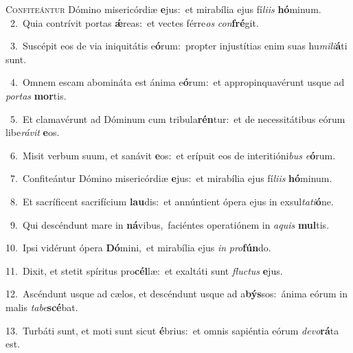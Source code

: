 \lettrine{\initial\textcolor{\initialcolor}{C}}{onfiteántur} Dómino misericórdiæ \textbf{e}\-jus:~\star et mirabília ejus fí\-\textit{li}\-\textit{is} \textbf{hó}\-minum.\\
{\numbfont\textcolor{\numbcolor}{~2.}}~Quia contrívit portas \textbf{ǽ}\-reas:~\star et vectes férre\textit{os} \textit{con}\-\textbf{fré}git.\par
{\numbfont\textcolor{\numbcolor}{~3.}}~Suscépit eos de via iniquitátis e\-\textbf{ó}\-rum:~\star propter injustítias enim suas hu\-\textit{mi}\-\textit{li}\textbf{á}ti sunt.\par
{\numbfont\textcolor{\numbcolor}{~4.}}~Omnem escam abomináta est ánima e\-\textbf{ó}\-rum:~\star et appropinquavérunt usque ad \textit{por}\-\textit{tas} \textbf{mor}\-tis.\par
{\numbfont\textcolor{\numbcolor}{~5.}}~Et clamavérunt ad Dóminum cum tribula\-\textbf{rén}\-tur:~\star et de necessitátibus eórum libe\-\textit{rá}\-\textit{vit} \textbf{e}\-os.\par
{\numbfont\textcolor{\numbcolor}{~6.}}~Misit verbum suum, et sanávit \textbf{e}\-os:~\star et erípuit eos de interitióni\textit{bus} \textit{e}\-\textbf{ó}rum.\par
{\numbfont\textcolor{\numbcolor}{~7.}}~Confiteántur Dómino misericórdiæ \textbf{e}\-jus:~\star et mirabília ejus fí\-\textit{li}\-\textit{is} \textbf{hó}\-minum.\par
{\numbfont\textcolor{\numbcolor}{~8.}}~Et sacríficent sacrifícium \textbf{lau}\-dis:~\star et annúntient ópera ejus in exsul\-\textit{ta}\-\textit{ti}\textbf{ó}ne.\par
{\numbfont\textcolor{\numbcolor}{~9.}}~Qui descéndunt mare in \textbf{ná}\-vibus,~\star faciéntes operatiónem in \textit{a}\-\textit{quis} \textbf{mul}\-tis.\par
{\numbfont\textcolor{\numbcolor}{10.}}~Ipsi vidérunt ópera \textbf{Dó}\-mini,~\star et mirabília ejus \textit{in} \textit{pro}\-\textbf{fún}do.\par
{\numbfont\textcolor{\numbcolor}{11.}}~Dixit, et stetit spíritus pro\-\textbf{cél}\-læ:~\star et exaltáti sunt \textit{fluc}\-\textit{tus} \textbf{e}\-jus.\par
{\numbfont\textcolor{\numbcolor}{12.}}~Ascéndunt usque ad cælos, et descéndunt usque ad a\-\textbf{býs}\-sos:~\star ánima eórum in malis \textit{ta}\-\textit{be}\textbf{scé}bat.\par
{\numbfont\textcolor{\numbcolor}{13.}}~Turbáti sunt, et moti sunt sicut \textbf{é}\-brius:~\star et omnis sapiéntia eórum \textit{de}\-\textit{vo}\textbf{rá}ta est.\par
